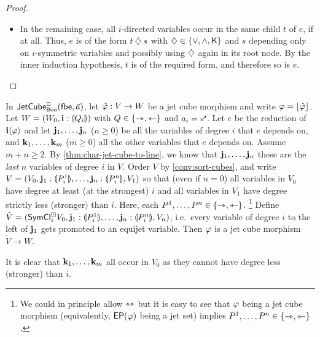 \documentclass[a4paper]{memoir}
\begin{document}
\begin{proof}
\begin{itemize}
		\item In the remaining case, all $i$-directed variables occur in the same child $t$ of $e$, if at all.
		Thus, $e$ is of the form $t \mathbin{\diamondsuit} s$ with $\mathbin{\diamondsuit} \in \mathopen{}\left\{ {\vee}, {\wedge}, {\mathbin{\mathsf{K}}} \right\}\mathclose{}$ and $s$ depending only on $i$-symmetric variables and possibly using $\mathbin{\diamondsuit}$ again in its root node.
		By the inner induction hypothesis, $t$ is of the required form, and therefore so is $e$. \qedhere
	\end{itemize}
\end{proof}
\begin{lemma} \label{thm:left-of-connection}
	In $\mathsf{JetCube}^{\Box}_{\mathsf{Boo}}\mathopen{}\left( {\mathsf{fbe}},\vec a \right)\mathclose{}$, let $\hat {\varphi} : V \to W$ be a jet cube morphism and write $\varphi = \mathopen{}\left\lfloor \hat {\varphi} \right\rfloor\mathclose{}$.
	Let $W = (W_0, \mathbf{i} : {\llparenthesis Q_i \rrparenthesis})$ with $Q \in \mathopen{}\left\{ \rightarrowtriangle, \leftarrowtriangle \right\}\mathclose{}$ and $a_i = \ypolar$.
	Let $e$ be the reduction of $\mathbf{i} \langle \varphi \rangle$ and let $\mathbf{j}_1, \ldots, \mathbf{j}_n$ ($n \geq 0$) be all the variables of degree $i$ that $e$ depends on, and $\mathbf{k}_1, \ldots, \mathbf{k}_m$ ($m \geq 0$) all the other variables that $e$ depends on.
	Assume $m+n \geq 2$.
	By \cref{thm:char-jet-cube-to-line}, we know that $\mathbf{j}_1, \ldots, \mathbf{j}_n$ these are the \emph{last} $n$ variables of degree $i$ in $V$.
	Order $V$ by \cref{conv:sort-cubes}, and write $V = (V_0, \mathbf{j}_1 : {\llparenthesis P^1_i \rrparenthesis}, \ldots, \mathbf{j}_n : {\llparenthesis P^n_i \rrparenthesis}, V_1)$ so that (even if $n = 0$) all variables in $V_0$ have degree at least (at the strongest) $i$ and all variables in $V_1$ have degree strictly less (stronger) than $i$.
	Here, each $P^1, \ldots, P^n \in \mathopen{}\left\{ \rightarrowtriangle, \leftarrowtriangle \right\}\mathclose{}$.%
	\footnote{We could in principle allow $\leftrightarrowtriangle$ but it is easy to see that $\varphi$ being a jet cube morphism (equivalently, $\mathsf{EP}(\varphi)$ being a jet set) implies $P^1, \ldots, P^n \in \mathopen{}\left\{ \rightarrowtriangle, \leftarrowtriangle \right\}\mathclose{}$.}
	Define $\tilde V = (\mathsf{SymCl}^\boxdot_i V_0, \mathbf{j}_1 : {\llparenthesis P^1_i \rrparenthesis}, \ldots, \mathbf{j}_n : {\llparenthesis P^n_i \rrparenthesis}, V_n)$, i.e.\ every variable of degree $i$ to the left of $\mathbf{j}_1$ gets promoted to an equijet variable.
	Then $\varphi$ is a jet cube morphism $\tilde V \to W$.
\end{lemma}
It is clear that $\mathbf{k}_1, \ldots, \mathbf{k}_m$ all occur in $V_0$ as they cannot have degree less (stronger) than $i$.
\end{document}
